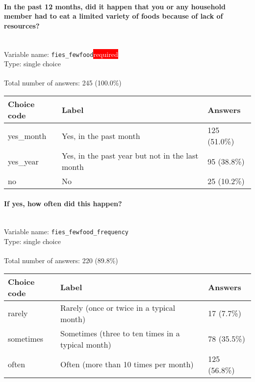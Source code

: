 \documentclass[11.5pt, a4paper]{scrartcl}
\begin{document}
\paragraph{In the past 12 months, did it happen that you or any household member had to eat a limited variety of foods because of lack of resources? }
\  \\Variable name: \texttt{fies\_fewfood}\hfill\colorbox{red}{\small{\textcolor{white}{required}}}\\
 Type: single choice\\
\\Total number of answers: 245 (100.0\%)
\\[0.2em] \begin{tabular}{p{4cm}|p{8cm}|p{3cm}}
Choice code & Label & Answers \\
\hline
yes\_month & Yes, in the past month& \cellcolor{color2}125 (51.0\%)\\
\cellcolor{mygray} yes\_year & \cellcolor{mygray}Yes, in the past year but not in the last month & \cellcolor{color1}95 (38.8\%)\\
no & No& \cellcolor{color0}25 (10.2\%)\\
\end{tabular}
\paragraph{If yes, how often did this happen? }
\  \\Variable name: \texttt{fies\_fewfood\_frequency}\\
Type: single choice\\
\\Total number of answers: 220 (89.8\%)
\\[0.2em] \begin{tabular}{p{4cm}|p{8cm}|p{3cm}}
Choice code & Label & Answers \\
\hline
rarely & Rarely (once or twice in a typical month)& \cellcolor{color0}17 (7.7\%)\\
\cellcolor{mygray} sometimes & \cellcolor{mygray}Sometimes (three to ten times in a typical month) & \cellcolor{color1}78 (35.5\%)\\
often & Often (more than 10 times per month)& \cellcolor{color2}125 (56.8\%)\\
\end{tabular}
\end{document}
